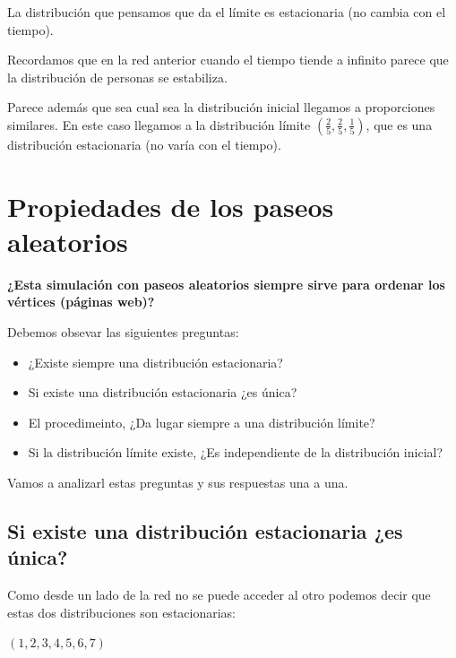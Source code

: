 	La distribución que pensamos que da el límite es estacionaria (no cambia con el tiempo).




Recordamos que en la red anterior cuando el tiempo tiende a infinito parece que la distribución de personas se estabiliza.


Parece además que sea cual sea la distribución inicial llegamos a proporciones similares. En este caso llegamos a la distribución límite $\left(\frac{2}{5},\frac{2}{5},\frac{1}{5}\right)$, que es una distribución estacionaria (no varía con el tiempo).

\section{Propiedades de los paseos aleatorios}

\textbf{¿Esta simulación con paseos aleatorios siempre sirve para ordenar los vértices (páginas web)?}

Debemos obsevar las siguientes preguntas:

\begin{itemize}
	\item ¿Existe siempre una distribución estacionaria?
	\item Si existe una distribución estacionaria ¿es única?
	\item El procedimeinto, ¿Da lugar siempre a una distribución límite?
	\item Si la distribución límite existe, ¿Es independiente de la distribución inicial?

\end{itemize}

Vamos a analizarl estas preguntas y sus respuestas una a una.

\subsection{Si existe una distribución estacionaria ¿es única?}
\label{P2}

\begin{center}
	\centering
\end{center}

Como desde un lado de la red no se puede acceder al otro podemos decir que estas dos distribuciones son estacionarias:

$(1, 2, 3, 4, 5, 6, 7)$

